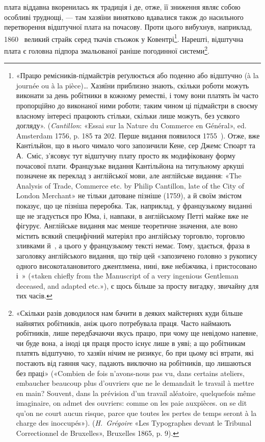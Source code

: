плата віддавна вкоренилась як традиція і де, отже, її зниження
являє собою особливі труднощі, — там хазяїни винятково вдавалися
також до насильного перетворення відштучної плата на почасову.
Проти цього вибухнув, наприклад, 1860~ великий страйк
серед ткачів стьожок у Ковентрі\footnote{
«Працю ремісників-підмайстрів реґулюється або поденно або
відштучно (à la journée ou à la pièce)\dots{} Хазяїни приблизно знають,
скільки роботи можуть виконати за день робітники в кожному реместві,
і тому вони платять їм часто пропорційно до виконаної ними роботи;
таким чином ці підмайстри в своєму власному інтересі працюють стільки,
скільки лише можуть, без усякого догляду». (\emph{Cantillon}: «Essai sur la
Nature du Commerce en Général», ed. Amsterdam 1756, p. 185 та 202. Перше видання появилося 1755~). Отже, вже Кантільйон, що в нього
чимало чого запозичили Кене, сер Джемс Стюарт та А.~Сміс, з'ясовує
тут відштучну плату просто як модифіковану форму почасової плати.
Французьке видання Кантільйона на титульному аркуші позначене як
переклад з англійської мови, але англійське видання: «The Analysis
of Trade, Commerce etc. by Philip Cantillon, late of the City of London
Merchant» не тільки датоване пізніше (1759), а й своїм змістом показує,
що це пізніша переробка. Так, наприклад, у французькому виданні ще
не згадується про Юма, і, навпаки, в англійському Петті майже вже не
фігурує. Англійське видання має менше теоретичне значення, але воно
містить всякий специфічний матеріял про англійську торговлю, торговлю
зливками й~, а цього у французькому тексті немає. Тому, здається,
фраза в заголовку англійського видання, що твір цей «запозичено головно
з рукопису одного високоталановитого джентлмена, нині, вже небіжчика,
і пристосовано і~» («taken chiefly from the Manuscript of
a very ingenious Gentleman deceased, and adapted etc.»), є щось більше
за просту вигадку, звичайну для тих часів.
}. Нарешті, відштучна плата
є головна підпора змальованої раніше погодинної системи\footnote{
«Скільки разів доводилося нам бачити в деяких майстернях куди
більше найнятих робітників, аніж цього потребувала праця. Часто наймають
робітників, лише передбачаючи якусь працю, при чому ще невідомо
напевне, чи буде вона, а іноді ця праця просто існує лише в уяві;
а що робітникам платять відштучно, то хазяїн нічим не ризикує, бо при
цьому всі втрати, які постають від гаяння часу, падають виключно на
робітників, що лишаються без праці» («Combien de fois n’avons-nous
pas vu, dans certains ateliers, embaucher beaucoup plus d’ouvriers que
ne le demandait le travail à mettre en main? Souvent, dans la prévision
d’un travail aléatoire, quelquefois même imaginaire, on admet des ouvriers:
comme on les paie auxpièces. on se dit qu’on ne court aucun risque, parce
que toutes les pertes de temps seront à la charge des inoccupés»). (\emph{H.~Grégoire}
«Les Typographes devant le Tribunal Correctionnel de Bruxelles»,
Bruxelles 1865, p. 9).
}.


